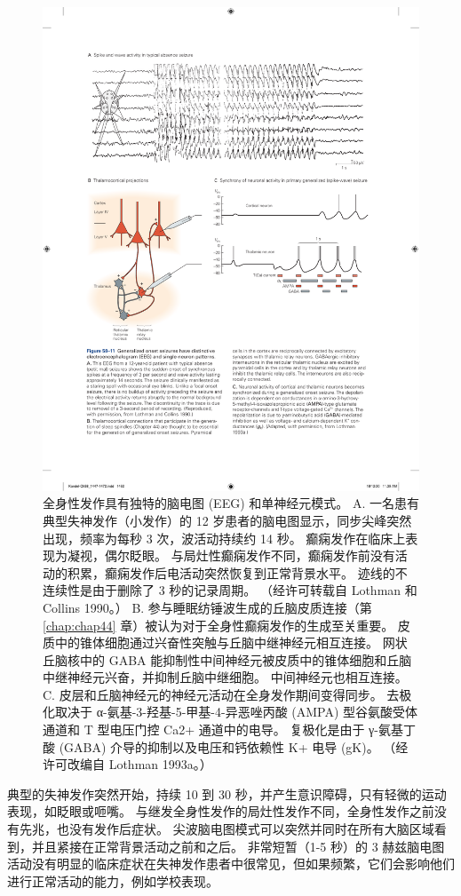 \begin{figure}[htbp]
	\centering
	\includegraphics[width=0.9\linewidth]{chap58/fig_58_11}
	\caption{全身性发作具有独特的脑电图 (EEG) 和单神经元模式。 A. 一名患有典型失神发作（小发作）的 12 岁患者的脑电图显示，同步尖峰突然出现，频率为每秒 3 次，波活动持续约 14 秒。 癫痫发作在临床上表现为凝视，偶尔眨眼。 与局灶性癫痫发作不同，癫痫发作前没有活动的积累，癫痫发作后电活动突然恢复到正常背景水平。 迹线的不连续性是由于删除了 3 秒的记录周期。 （经许可转载自 Lothman 和 Collins 1990。） B. 参与睡眠纺锤波生成的丘脑皮质连接（第 \ref{chap:chap44} 章）被认为对于全身性癫痫发作的生成至关重要。 皮质中的锥体细胞通过兴奋性突触与丘脑中继神经元相互连接。 网状丘脑核中的 GABA 能抑制性中间神经元被皮质中的锥体细胞和丘脑中继神经元兴奋，并抑制丘脑中继细胞。 中间神经元也相互连接。 C. 皮层和丘脑神经元的神经元活动在全身发作期间变得同步。 去极化取决于 α-氨基-3-羟基-5-甲基-4-异恶唑丙酸 (AMPA) 型谷氨酸受体通道和 T 型电压门控 Ca2+ 通道中的电导。 复极化是由于 γ-氨基丁酸 (GABA) 介导的抑制以及电压和钙依赖性 K+ 电导 (gK)。 （经许可改编自 Lothman 1993a。）}
	\label{fig:58_11}
\end{figure}

典型的失神发作突然开始，持续 10 到 30 秒，并产生意识障碍，只有轻微的运动表现，如眨眼或咂嘴。 与继发全身性发作的局灶性发作不同，全身性发作之前没有先兆，也没有发作后症状。 尖波脑电图模式可以突然并同时在所有大脑区域看到，并且紧接在正常背景活动之前和之后。 非常短暂（1-5 秒）的 3 赫兹脑电图活动没有明显的临床症状在失神发作患者中很常见，但如果频繁，它们会影响他们进行正常活动的能力，例如学校表现。

